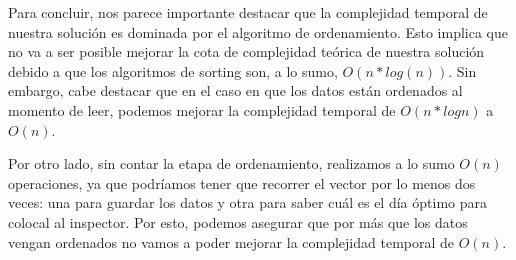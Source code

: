 Para concluir, nos parece importante destacar que la complejidad temporal de nuestra solución es dominada por el algoritmo de ordenamiento. Esto implica que no va a ser posible mejorar la cota de complejidad teórica de nuestra solución debido a que los algoritmos de sorting son, a lo sumo, $O(n*log(n))$. Sin embargo, cabe destacar que en el caso en que los datos están ordenados al momento de leer, podemos mejorar la complejidad temporal de $O(n * log n)$ a $O(n)$.

Por otro lado, sin contar la etapa de ordenamiento, realizamos a lo sumo $O(n)$ operaciones, ya que podríamos tener que recorrer el vector por lo menos dos veces: una para guardar los datos y otra para saber cuál es el día óptimo para colocal al inspector. Por esto, podemos asegurar que por más que los datos vengan ordenados no vamos a poder mejorar la complejidad temporal de $O(n)$.